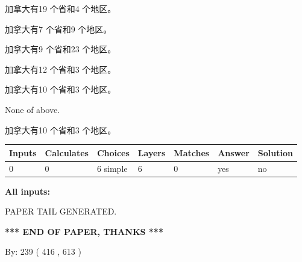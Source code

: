 \documentclass{ctexart}
\begin{document}
 
加拿大有19 个省和4 个地区。
 
 
加拿大有7 个省和9 个地区。
 
 
加拿大有9 个省和23 个地区。
 
 
加拿大有12 个省和3 个地区。
 
 
加拿大有10 个省和3 个地区。
 
 
 None of above.
 
 
\noindent{}
 
 
加拿大有10 个省和3 个地区。
 
 
\noindent{}
 
 
   
   
   
   
\noindent\begin{tabular}{|l|l|l|l|l|l|l|}
 \hline
Inputs & Calculates & Choices & Layers & Matches & Answer & Solution \\ \hline
 0  & 
 0  & 
 6
  simple  
  & 
 6  & 
 0  & 
  yes & 
  no 
  \\ \hline
 \end{tabular}
   
   
   
   
\noindent{}
   
   
   
   
\noindent\vspace{0.1in}\hspace{-0.08in} {\textbf{\Large{All inputs: }}}
   
   
   
   
   
   
 \vspace{0.2in}
 
   
   
\vspace{2.0in} PAPER TAIL GENERATED.
   
   
   
   
\vspace{1.0in} 
{\textbf{\large{ *** END OF PAPER, THANKS *** }}} 
   
   
\hspace{1.0in} By: 
 239 ( 416 ,  613 )
   
\end{document}
